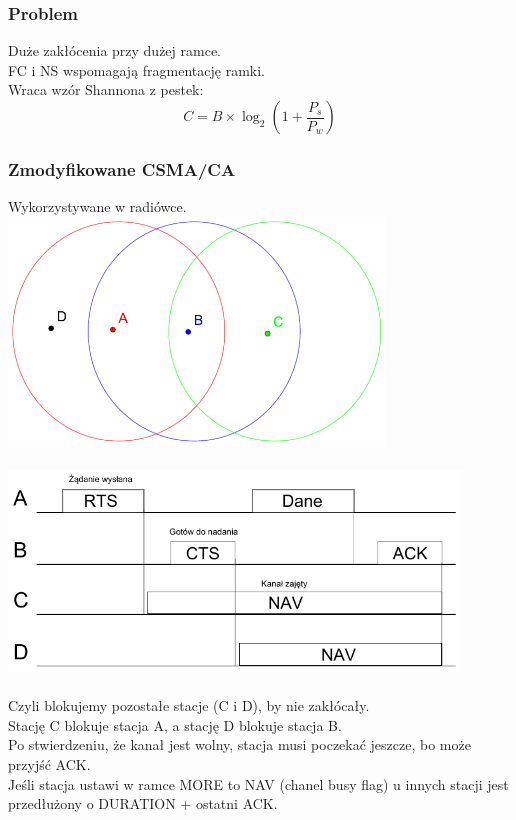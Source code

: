 		\subsubsection{Problem}
				Duże zakłócenia przy dużej ramce.\\
				FC i NS wspomagają fragmentację ramki.\\
				Wraca wzór Shannona z pestek:\\
				$$ C=B\times \log_2{(1+\frac{P_s}{P_w})} $$
		\subsubsection{Zmodyfikowane CSMA/CA}
			Wykorzystywane w radiówce.\\
			\includegraphics[width=10cm]{./images/image23.pdf}\\\\
			\includegraphics[width=12cm]{./images/image24.pdf}\\\\
			Czyli blokujemy pozostałe stacje (C i D), by nie zakłócały.\\
			Stację C blokuje stacja A, a stację D blokuje stacja B.\\
			Po stwierdzeniu, że kanał jest wolny, stacja musi poczekać jeszcze, bo może przyjść ACK.\\
			Jeśli stacja ustawi w ramce MORE to NAV (chanel busy flag) u innych stacji jest przedłużony o DURATION + ostatni ACK.
